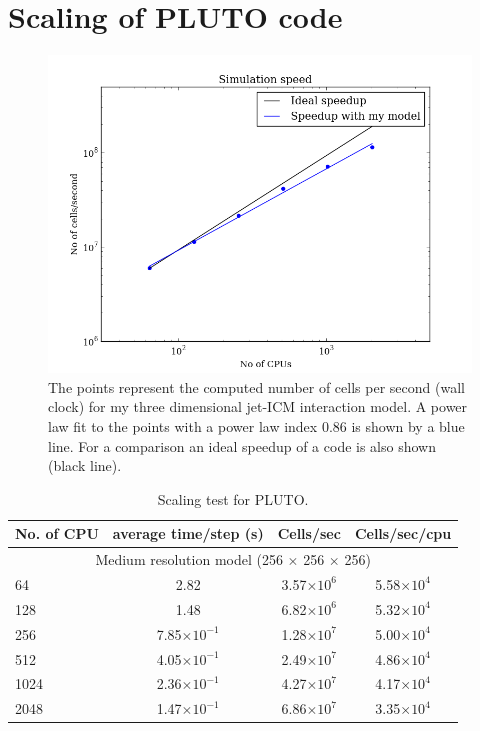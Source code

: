 \section{Scaling of PLUTO code}\label{s:pt}
\begin{figure}
\centering
\includegraphics[width=12cm]{ppt.png}
\caption{ The points represent the computed number of cells per second (wall clock) for my three dimensional jet-ICM interaction model. A power law fit to the points with a power law index 0.86 is shown by a blue line. For a comparison an ideal speedup of a code is also shown (black line). }
\label{f:ppt}
\end{figure}

\begin{table}
\caption{Scaling test for PLUTO.}
\centering
\begin{tabular}{l * {3}{c}}
\hline \hline
No. of CPU & average time/step (s) & Cells/sec & Cells/sec/cpu  \\
\hline 
	\multicolumn{4}{c}{Medium resolution model (256 $\times$ 256 $\times$ 256)} \\ 
	\hline
	 64   & 2.82  &  3.57$\times10^6$ &   5.58$\times10^4$    \\
	 128 & 1.48  & 6.82$\times10^6$ &  5.32$\times10^4$ \\
	 256  & 7.85$\times10^{-1}$ & 1.28$\times10^7$  & 5.00$\times10^4$ \\
	 512  & 4.05$\times10^{-1}$ & 2.49$\times10^7$  & 4.86$\times10^4$ \\
	 1024 & 2.36$\times10^{-1}$ & 4.27$\times10^7$  & 4.17$\times10^4$ \\
	 2048  & 1.47$\times10^{-1}$ & 6.86$\times10^7$  & 3.35$\times10^4$ \\
	\hline
\end{tabular}
\label{t:pst}
\end{table}

